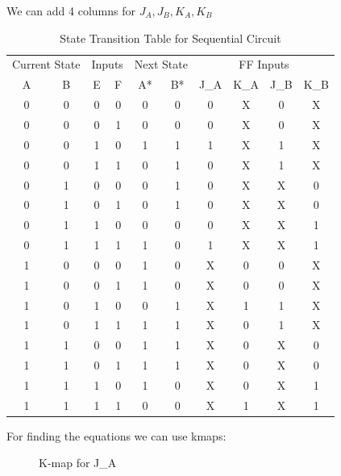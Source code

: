 \documentclass[table ]{article}
\begin{document}
We can add 4 columns for \(J_A , J_B, K_A, K_B\)

\begin{table}[H]
    \caption{State Transition Table for Sequential Circuit}
    \begin{center}
    \begin{tabular}{cccc|cc|cc|cc}
    \hline
    \multicolumn{2}{c}{Current State} & \multicolumn{2}{c|}{Inputs} & \multicolumn{2}{c}{Next State} & \multicolumn{4}{c}{FF Inputs} \\
    A & B & E & F & A* & B* & J\_A & K\_A & J\_B & K\_B\\
    \hline
    0 & 0 & 0 & 0 & 0 & 0 & 0 & X & 0 & X \\
    0 & 0 & 0 & 1 & 0 & 0 & 0 & X & 0 & X \\
    0 & 0 & 1 & 0 & 1 & 1 & 1 & X & 1 & X \\
    0 & 0 & 1 & 1 & 0 & 1 & 0 & X & 1 & X \\
    \hline
    
    0 & 1 & 0 & 0 & 0 & 1 & 0 & X & X & 0 \\
    0 & 1 & 0 & 1 & 0 & 1 & 0 & X & X & 0 \\
    0 & 1 & 1 & 0 & 0 & 0 & 0 & X & X & 1 \\
    0 & 1 & 1 & 1 & 1 & 0 & 1 & X & X & 1 \\
    \hline
    
    1 & 0 & 0 & 0 & 1 & 0 & X & 0 & 0 & X \\
    1 & 0 & 0 & 1 & 1 & 0 & X & 0 & 0 & X \\
    1 & 0 & 1 & 0 & 0 & 1 & X & 1 & 1 & X \\
    1 & 0 & 1 & 1 & 1 & 1 & X & 0 & 1 & X \\
    \hline
    
    1 & 1 & 0 & 0 & 1 & 1 & X & 0 & X & 0 \\
    1 & 1 & 0 & 1 & 1 & 1 & X & 0 & X & 0 \\
    1 & 1 & 1 & 0 & 1 & 0 & X & 0 & X & 1 \\
    1 & 1 & 1 & 1 & 0 & 0 & X & 1 & X & 1 \\
    \hline
    \end{tabular}
    \end{center}
    \label{tab:state_transitio2}
    \end{table}

For finding the equations we can use kmaps:



\begin{figure}[H]
    \centering
    \begin{karnaugh-map}[4][4][1][$F$][$E$][$B$][$A$]
    \end{karnaugh-map}
    
    \caption{K-map for J\_A}
    \label{fig:kmap_ja}
\end{figure}
\end{document}
